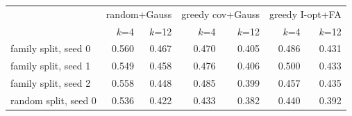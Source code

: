 \begin{tabular}{lrrrrrr}\toprule
 & \multicolumn{2}{c}{random+Gauss} & \multicolumn{2}{c}{greedy cov+Gauss} & \multicolumn{2}{c}{greedy I-opt+FA} \\
 & $k$=4 & $k$=12 & $k$=4 & $k$=12 & $k$=4 & $k$=12 \\\midrule
family split, seed 0 & 0.560 & 0.467 & 0.470 & 0.405 & 0.486 & 0.431 \\
family split, seed 1 & 0.549 & 0.458 & 0.476 & 0.406 & 0.500 & 0.433 \\
family split, seed 2 & 0.558 & 0.448 & 0.485 & 0.399 & 0.457 & 0.435 \\
random split, seed 0 & 0.536 & 0.422 & 0.433 & 0.382 & 0.440 & 0.392 \\
\bottomrule\end{tabular}
